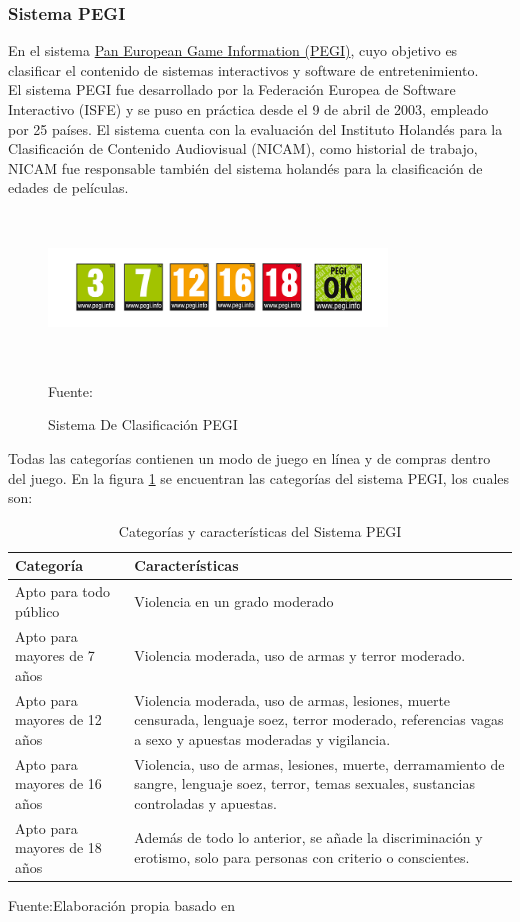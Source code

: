 \subsubsection{Sistema PEGI}

En el sistema \href{https://pegi.info/es}{Pan European Game Information (PEGI)}, cuyo objetivo es clasificar el contenido de sistemas interactivos y software de entretenimiento. 
\\
El sistema PEGI fue desarrollado por la Federación Europea de Software Interactivo (ISFE) y se puso en práctica desde el 9 de abril de 2003, empleado por 25 países. El sistema cuenta con la evaluación del Instituto Holandés para la Clasificación de Contenido Audiovisual (NICAM), como historial de trabajo, NICAM fue responsable también del sistema holandés para la clasificación de edades de películas.

\begin{figure}[t!]
	\centering
	\includegraphics[width=9cm,height=4cm,]{./Images/pegi.png}
	\caption{Sistema De Clasificación PEGI}
	\footnotesize Fuente: \cite{pegi}
	\label{pegi}
\end{figure}
Todas las categorías contienen un modo de juego en línea y de compras dentro del juego. En la figura \ref{pegi} se encuentran las categorías del sistema PEGI, los cuales son:
\begin{table}[t]
	\begin{center}
		\begin{tabular}{| m{5cm} | m{10cm} | }
			\hline Categoría & Características \\ \hline
			Apto para todo público & Violencia en un grado moderado \\ \hline
			Apto para mayores de 7 años & Violencia moderada, uso de armas y terror moderado. \\ \hline
			Apto para mayores de 12 años & Violencia moderada, uso de armas, lesiones,
			muerte censurada, lenguaje soez, terror moderado, referencias vagas a sexo y
			apuestas moderadas y vigilancia. \\ \hline
			Apto para mayores de 16 años & Violencia, uso de armas, lesiones, muerte, derramamiento de sangre, lenguaje soez, terror, temas sexuales, sustancias controladas
			y apuestas.
\\ \hline
			Apto para mayores de 18 años & Además de todo lo anterior, se añade la discriminación y
			erotismo, solo para personas con criterio o conscientes. \\ \hline
		\end{tabular}
		\caption{Categorías y características del Sistema PEGI}
		\footnotesize Fuente:Elaboración propia basado en \cite{pegi}
	\end{center}
\end{table}



